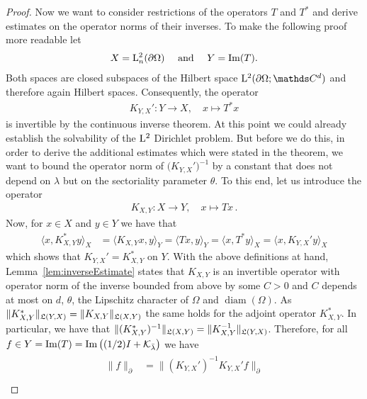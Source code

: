 \begin{proof}
  Now we want to consider restrictions of the operators $T$ and $T^*$ and derive estimates on the operator norms of their inverses.
  To make the following proof more readable let 
  \begin{align*}
    X = \mathrm{L}^2_n(\partial\Omega)\quad\text{ and }\quad Y = \operatorname{Im}(T).
  \end{align*}
  Both spaces are closed subspaces of the Hilbert space $\Ell^2(\partial\Omega; \C^d)$ and therefore again Hilbert spaces.
  Consequently, the operator
  \begin{align*}
    K_{Y,X}' \colon Y \to X, \quad x \mapsto T^* x
  \end{align*}
  is invertible by the continuous inverse theorem.
  At this point we could already establish the solvability of the $\mathrm{L}^2$ Dirichlet problem.
  But before we do this, in order to derive the additional estimates which were stated in the theorem, we want to bound the operator norm of $\big(K_{Y,X}'\big)^{-1}$ by a constant that does not depend on $\lambda$ but on the sectoriality parameter $\theta$.
  To this end, let us introduce the operator
  \begin{align*}
    K_{X,Y} \colon X \to Y, \quad x \mapsto T x \,.
  \end{align*}
  Now, for $x \in X$ and $y \in Y$ we have that
  \begin{align*}
    \Big\langle x, K_{X,Y}^* y \Big\rangle_X
    & =\Big\langle K_{X,Y}^{} x, y  \Big\rangle_Y
      =\Big\langle T x, y        \Big\rangle_Y
      =\Big\langle x, T^*y       \Big\rangle_X
      =\Big\langle x, K_{Y,X}' y \Big\rangle_X
  \end{align*}
  which shows that $K_{Y,X}' = K_{X,Y}^*$ on $Y$.
  With the above definitions at hand, Lemma~\ref{lem:inverseEstimate} states that $K_{X,Y}^{}$ is an invertible operator with operator norm of the inverse bounded from above by some $C > 0$ and $C$ depends at most on $d$, $\theta$, the Lipschitz character of $\Omega$ and $\operatorname{diam}(\Omega)$.
  As $\| K_{X,Y}^* \|_{\mathfrak{L}(Y,X)} = \|K_{X,Y}\|_{\mathfrak{L}(X, Y)}$ the same holds for the adjoint operator $K_{X,Y}^*$.
  In particular, we have that $\|(K_{X,Y}^*)^{-1} \|_{\mathfrak{L}(X,Y)} = \|K_{X,Y}^{-1}\|_{\mathfrak{L}(Y,X)}$.
  Therefore, for all $f \in Y = \operatorname{Im}(T) = \operatorname{Im} \big((1/2)I + \mathcal{K}_{\bar \lambda}\big)$ we have
  \begin{align}
    \label{eq:dualityArgument}
    \begin{alignedat}{1}
    \| f\|_\partial^{}
    &= \Big\| (K_{Y,X}')^{-1} K_{Y,X}' f \Big\|_\partial^{} \\

\end{alignedat}
\end{align}
\end{proof}
